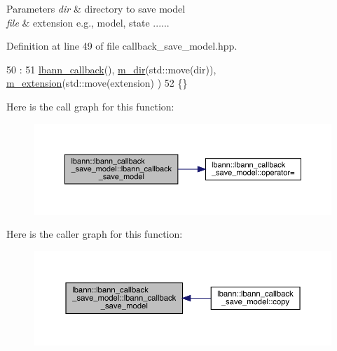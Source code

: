 \begin{DoxyParams}{Parameters}
{\em dir} & directory to save model \\
\hline
{\em file} & extension e.\+g., model, state ...... \\
\hline
\end{DoxyParams}


Definition at line 49 of file callback\+\_\+save\+\_\+model.\+hpp.


\begin{DoxyCode}
50                                                           :
51     \hyperlink{classlbann_1_1lbann__callback_a679057298a41ddd47f08c157f756c584}{lbann\_callback}(), \hyperlink{classlbann_1_1lbann__callback__save__model_aca89bd794b4a15b3beb89f3da464fbcd}{m\_dir}(std::move(dir)), \hyperlink{classlbann_1_1lbann__callback__save__model_a76f51ce7ea7bbb1aff331102c87662bd}{m\_extension}(std::move(extension)
      )
52     \{\}
\end{DoxyCode}
Here is the call graph for this function\+:\nopagebreak
\begin{figure}[H]
\begin{center}
\leavevmode
\includegraphics[width=350pt]{classlbann_1_1lbann__callback__save__model_a603d5e3c418ddc29724664eeff401707_cgraph}
\end{center}
\end{figure}
Here is the caller graph for this function\+:\nopagebreak
\begin{figure}[H]
\begin{center}
\leavevmode
\includegraphics[width=350pt]{classlbann_1_1lbann__callback__save__model_a603d5e3c418ddc29724664eeff401707_icgraph}
\end{center}
\end{figure}
\mbox{\label{classlbann_1_1lbann__callback__save__model_ab5c646c34145f0d5d07608e709495f39}} 
